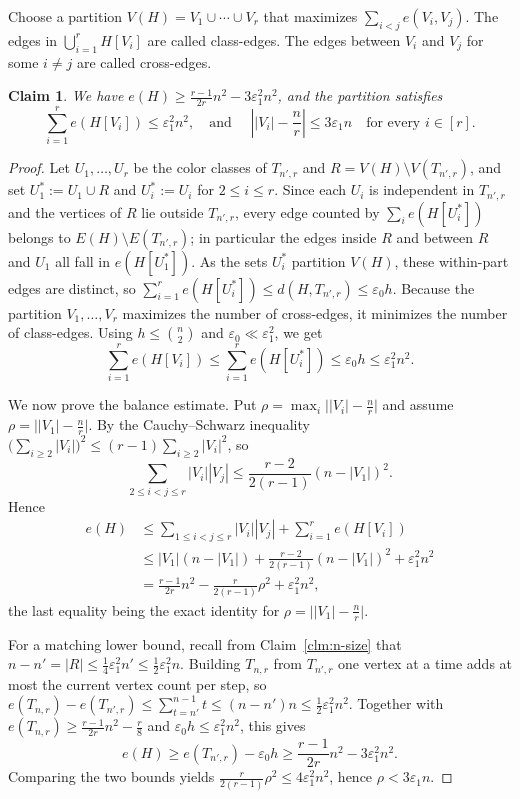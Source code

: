 \documentclass[11pt,a4paper]{article}
\newtheorem{claim}[theorem]{Claim}
\theoremstyle{definition}
\theoremstyle{plain}
\newcommand{\eps}{\varepsilon}
\renewcommand{\le}{\leqslant}
\renewcommand{\ge}{\geqslant}
\begin{document}
Choose a partition
$  V(H)=V_1\cup\cdots\cup V_r$ 
that maximizes $\sum_{i< j} e(V_i,V_j)$.  
The edges in $\bigcup_{i=1}^r H[V_i]$ are called class-edges. The edges between $V_i$ and $V_j$ for some $i\neq j$ are called cross-edges.  



\begin{claim}\label{clm:balanced-partition}
We have $  e(H)\ge \frac{r-1}{2r}n^2-3\eps_1^2n^2$, and 
the partition satisfies
\[
  \sum_{i=1}^r e(H[V_i])\le \eps_1^2n^2, \quad \text{and~} \quad 
    \left||V_i|-\frac nr\right|\le 3\eps_1n
  \quad
  \text{for every }i\in[r]. 
\]
\end{claim}


\begin{proof}
Let $U_1,\ldots,U_r$ be the color classes of $T_{n',r}$ and $R=V(H)\setminus V(T_{n',r})$,
and set $U_1^\ast:=U_1\cup R$ and $U_i^\ast:=U_i$ for $2\le i\le r$. Since each $U_i$ is
independent in $T_{n',r}$ and the vertices of $R$ lie outside $T_{n',r}$, every edge counted
by $\sum_i e(H[U_i^\ast])$ belongs to $E(H)\setminus E(T_{n',r})$; in particular the edges
inside $R$ and between $R$ and $U_1$ all fall in $e(H[U_1^\ast])$. As the sets $U_i^\ast$
partition $V(H)$, these within-part edges are distinct, so
$\sum_{i=1}^r e(H[U_i^\ast])\le d(H,T_{n',r})\le\eps_0h$.
Because the partition $V_1,\ldots,V_r$ maximizes the number of cross-edges, it minimizes the
number of class-edges. Using $h\le\binom n2$ and $\eps_0\ll\eps_1^2$, 
we get 
\[
  \sum_{i=1}^r e(H[V_i])\le\sum_{i=1}^r e(H[U_i^\ast])\le\eps_0h\le\eps_1^2n^2.
\]

We now prove the balance estimate. Put $\rho=\max_{i}\big||V_i|-\tfrac nr\big|$ and assume
$\rho=\big||V_1|-\tfrac nr\big|$. By the Cauchy--Schwarz inequality
$\big(\sum_{i\ge2}|V_i|\big)^2\le(r-1)\sum_{i\ge2}|V_i|^2$, so
$$\sum_{2\le i<j\le r}|V_i||V_j|\le\frac{r-2}{2(r-1)}(n-|V_1|)^2.$$
 Hence
\[
\begin{aligned}
  e(H)
  &\le\sum_{1\le i<j\le r}|V_i||V_j|+\sum_{i=1}^r e(H[V_i])\\
  &\le|V_1|(n-|V_1|)+\frac{r-2}{2(r-1)}(n-|V_1|)^2+\eps_1^2n^2 \\
    &=\frac{r-1}{2r}n^2-\frac{r}{2(r-1)}\rho^2+\eps_1^2n^2,
\end{aligned}
\]
the last equality being the exact identity for $\rho=\big||V_1|-\tfrac nr\big|$.

For a matching lower bound, recall from Claim~\ref{clm:n-size} that
$n-n'=|R|\le\frac{1}{4}\eps_1^2 n'\le\frac{1}{2} \eps_1^2 n$. Building $T_{n,r}$ from $T_{n',r}$ one
vertex at a time adds at most the current vertex count per step, so
$e(T_{n,r})-e(T_{n',r})\le\sum_{t=n'}^{n-1}t\le(n-n')n\le\frac{1}{2}\eps_1^2n^2$. 
Together with
$e(T_{n,r})\ge\frac{r-1}{2r}n^2-\frac r8$ and $\eps_0h\le\eps_1^2n^2$, this gives
\[
  e(H)\ge e(T_{n',r})-\eps_0h\ge\frac{r-1}{2r}n^2-3\eps_1^2n^2.
\]
Comparing the two bounds yields $\frac{r}{2(r-1)}\rho^2\le4\eps_1^2n^2$, hence $\rho<3\eps_1n$.
\end{proof}
\end{document}

